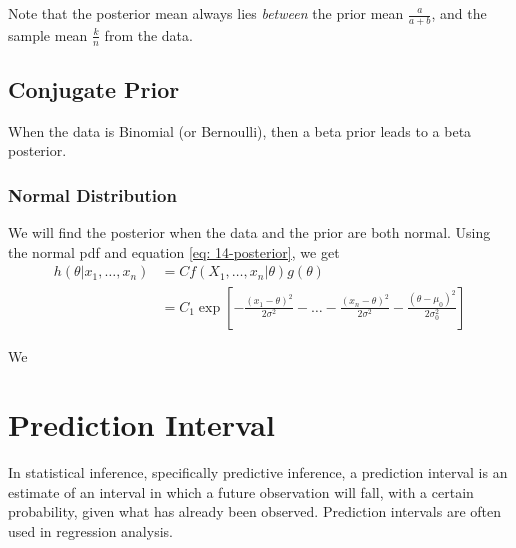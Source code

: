 \documentclass{article}
\begin{document}
\noindent Note that the posterior mean always lies \textit{between} the prior mean $\frac{a}{a+b}$, and the sample mean $\frac{k}{n}$ from the data. 

\subsection{Conjugate Prior}
When the data is Binomial (or Bernoulli), then a beta prior leads to a beta posterior. 

\subsubsection{Normal Distribution}

We will find the posterior when the data and the prior are both normal. Using the normal pdf and equation \ref{eq: 14-posterior}, we get \begin{align*}
    h(\theta | x_{1}, \dots , x_n) &= C f(X_{1}, \dots, x_n | \theta)g(\theta) \\ 
    &= C_{1} \exp \left[ - \frac{(x_{1}-\theta)^{2}}{2\sigma^{2}} - \dots - \frac{(x_n - \theta)^{2}}{2\sigma^{2}} - \frac{(\theta - \mu_0)^{2}}{2\sigma_0^{2}} \right]
\end{align*}

\noindent We 

\section{Prediction Interval}

In statistical inference, specifically predictive inference, a prediction interval is an estimate of an interval in which a future observation will fall, with a certain probability, given what has already been observed. Prediction intervals are often used in regression analysis. \\ 
\end{document}

